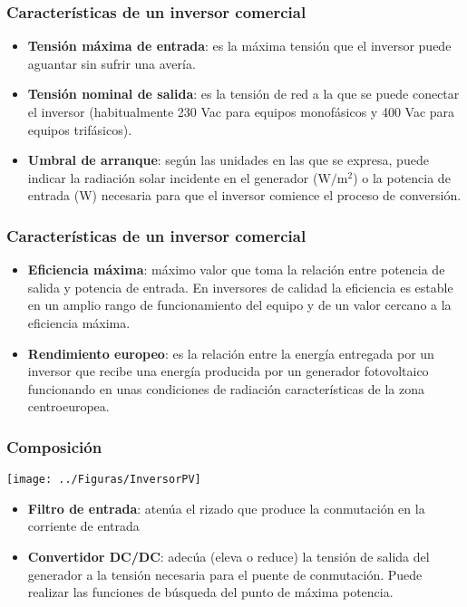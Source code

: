 \documentclass[serif, xcolor=dvipsnames]{beamer}
\begin{document}
\begin{frame}
  \frametitle{Características de un inversor comercial}
  \begin{itemize}
  \item \textbf{Tensión máxima de entrada}: es la máxima tensión que
    el inversor puede aguantar sin sufrir una avería.
  \item \textbf{Tensión nominal de salida}: es la tensión de red a la
    que se puede conectar el inversor (habitualmente 230 Vac para
    equipos monofásicos y 400 Vac para equipos trifásicos).
  \item \textbf{Umbral de arranque}: según las unidades en las que se
    expresa, puede indicar la radiación solar incidente en el
    generador ($\si{\watt\per\meter\squared}$) o la potencia de
    entrada (W) necesaria para que el inversor comience el proceso de
    conversión.
  \end{itemize}

\end{frame}
\begin{frame}
  \frametitle{Características de un inversor comercial}
  \begin{itemize}
  \item \textbf{Eficiencia máxima}: máximo valor que toma la relación
    entre potencia de salida y potencia de entrada. En inversores de
    calidad la eficiencia es estable en un amplio rango de
    funcionamiento del equipo y de un valor cercano a la eficiencia
    máxima.
  \item \textbf{Rendimiento europeo}: es la relación entre la energía
    entregada por un inversor que recibe una energía producida por un
    generador fotovoltaico funcionando en unas condiciones de
    radiación características de la zona centroeuropea.
  \end{itemize}

\end{frame}
\begin{frame}[plain]
  \frametitle{Composición}

  \begin{center}
    \texttt{[image: ../Figuras/InversorPV]}
    \par\end{center}
  \begin{itemize}
  \item \textbf{Filtro de entrada}: atenúa el rizado que produce la
    conmutación en la corriente de entrada
  \item \textbf{Convertidor DC/DC}: adecúa (eleva o reduce) la tensión
    de salida del generador a la tensión necesaria para el puente de
    conmutación.  Puede realizar las funciones de búsqueda del punto
    de máxima potencia.
  \end{itemize}

\end{frame}
\end{document}
